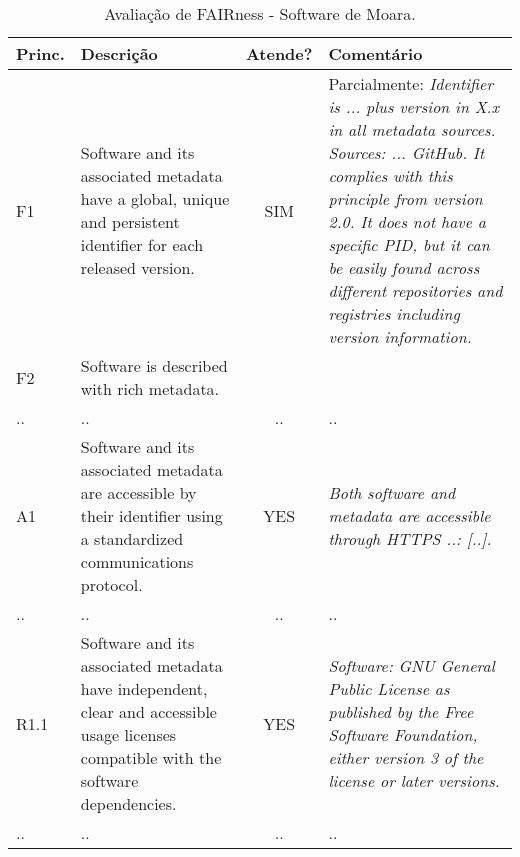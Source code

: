 
\begin{table}[htb]
    \caption{Avaliação de FAIRness - Software de Moara.}
    \centering
    \small
    \begin{tabular}{p{0.9cm}|p{5cm}|c|p{6cm}}
    \hline
    Princ. & Descrição & Atende? & Comentário 
    \\ \hline
     F1 & Software and its associated metadata have a global, unique and persistent identifier for each released version. & SIM & Parcialmente: \textit{Identifier is ... plus version in X.x in all metadata sources. Sources: ... GitHub. It complies with this principle from version 2.0. It does not have a specific PID, but it can be easily found across different repositories and registries including version information.} \\
     F2 & Software is described with rich metadata. & & \\
     .. & .. & .. & ..\\
     A1 & Software and its associated metadata are accessible by their identifier using a standardized communications protocol. & YES & \textit{Both software and metadata are accessible through HTTPS ..: [..].}
     \\
    .. & .. & .. & ..\\
     R1.1 & Software and its associated metadata have independent, clear and accessible usage licenses compatible with the software dependencies. & YES & 
     \textit{Software: GNU General Public License as published by the Free Software Foundation, either version 3 of the license or later versions.}
     \\
      .. & .. & .. & ..\\
      \hline
    \end{tabular} \label{tab:fairness:moara}
\end{table}
